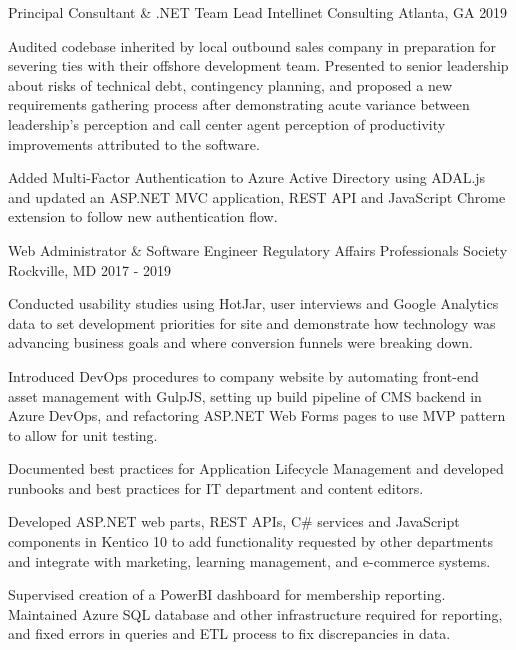 \begin{cventries}
  \cventry
    {Principal Consultant \& .NET Team Lead} %
    {Intellinet Consulting} %
    {Atlanta, GA} %
    {2019} %
    {
      \begin{cvitems} %
        \item {Audited codebase inherited by local outbound sales company in preparation for severing ties with their offshore development team. Presented to senior leadership about risks of technical debt, contingency planning, and proposed a new requirements gathering process after demonstrating acute variance between leadership’s perception and call center agent perception of productivity improvements attributed to the software.}
        \item {Added Multi-Factor Authentication to Azure Active Directory using ADAL.js and updated an ASP.NET MVC application, REST API and JavaScript Chrome extension to follow new authentication flow.}
      \end{cvitems}
    }

  \cventry
    {Web Administrator \& Software Engineer} %
    {Regulatory Affairs Professionals Society} %
    {Rockville, MD} %
    {2017 - 2019} %
    {
      \begin{cvitems} %
        \item {Conducted usability studies using HotJar, user interviews and Google Analytics data to set development priorities for site and demonstrate how technology was advancing business goals and where conversion funnels were breaking down.}
        \item {Introduced DevOps procedures to company website by automating front-end asset management with GulpJS, setting up build pipeline of CMS backend in Azure DevOps, and refactoring ASP.NET Web Forms pages to use MVP pattern to allow for unit testing.}
         \item {Documented best practices for Application Lifecycle Management and developed runbooks and best practices for IT department and content editors.}
         \item {Developed ASP.NET web parts, REST APIs, C\# services and JavaScript components in Kentico 10 to add functionality requested by other departments and integrate with marketing, learning management, and e-commerce systems.}
        \item {Supervised creation of a PowerBI dashboard for membership reporting. Maintained Azure SQL database and other infrastructure required for reporting, and fixed errors in queries and ETL process to fix discrepancies in data.}
      \end{cvitems}
    }


\end{cventries}
